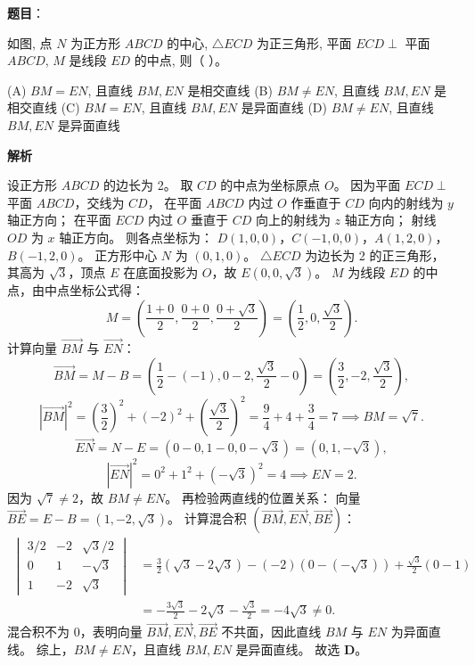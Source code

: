 \begin{answer}

\textbf{题目}：

如图, 点 $N$ 为正方形 $ABCD$ 的中心, $\triangle ECD$ 为正三角形, 平面 $ECD \perp$ 平面 $ABCD$, $M$ 是线段 $ED$ 的中点, 则（ ）。
\nopagebreak[4]
\begin{center}\end{center}
\nopagebreak[4]
(A) $BM = EN$, 且直线 $BM, EN$ 是相交直线  
(B) $BM \neq EN$, 且直线 $BM, EN$ 是相交直线  
(C) $BM = EN$, 且直线 $BM, EN$ 是异面直线  
(D) $BM \neq EN$, 且直线 $BM, EN$ 是异面直线

\textbf{解析}

设正方形 $ABCD$ 的边长为 2。
取 $CD$ 的中点为坐标原点 $O$。
因为平面 $ECD \perp$ 平面 $ABCD$，交线为 $CD$，
在平面 $ABCD$ 内过 $O$ 作垂直于 $CD$ 向内的射线为 $y$ 轴正方向；
在平面 $ECD$ 内过 $O$ 垂直于 $CD$ 向上的射线为 $z$ 轴正方向；
射线 $OD$ 为 $x$ 轴正方向。
则各点坐标为：
$D(1, 0, 0)$，$C(-1, 0, 0)$，$A(1, 2, 0)$，$B(-1, 2, 0)$。
正方形中心 $N$ 为 $(0, 1, 0)$。
$\triangle ECD$ 为边长为 2 的正三角形，其高为 $\sqrt{3}$，顶点 $E$ 在底面投影为 $O$，故 $E(0, 0, \sqrt{3})$。
$M$ 为线段 $ED$ 的中点，由中点坐标公式得：
\nopagebreak[4]
\[M = \left(\frac{1+0}{2}, \frac{0+0}{2}, \frac{0+\sqrt{3}}{2}\right) = \left(\frac{1}{2}, 0, \frac{\sqrt{3}}{2}\right).\]
计算向量 $\vec{BM}$ 与 $\vec{EN}$：
\nopagebreak[4]
\[\vec{BM} = M - B = \left(\frac{1}{2} - (-1), 0 - 2, \frac{\sqrt{3}}{2} - 0\right) = \left(\frac{3}{2}, -2, \frac{\sqrt{3}}{2}\right),\]
\nopagebreak[4]
\[|\vec{BM}|^2 = \left(\frac{3}{2}\right)^2 + (-2)^2 + \left(\frac{\sqrt{3}}{2}\right)^2 = \frac{9}{4} + 4 + \frac{3}{4} = 7 \implies BM = \sqrt{7}.\]
\nopagebreak[4]
\[\vec{EN} = N - E = (0 - 0, 1 - 0, 0 - \sqrt{3}) = (0, 1, -\sqrt{3}),\]
\nopagebreak[4]
\[|\vec{EN}|^2 = 0^2 + 1^2 + (-\sqrt{3})^2 = 4 \implies EN = 2.\]
因为 $\sqrt{7} \neq 2$，故 $BM \neq EN$。
再检验两直线的位置关系：
向量 $\vec{BE} = E - B = (1, -2, \sqrt{3})$。
计算混合积 $(\vec{BM}, \vec{EN}, \vec{BE})$：
\nopagebreak[4]
\[
\begin{aligned}
\begin{vmatrix} 3/2 & -2 & \sqrt{3}/2 \\ 0 & 1 & -\sqrt{3} \\ 1 & -2 & \sqrt{3} \end{vmatrix}
&= \frac{3}{2}(\sqrt{3} - 2\sqrt{3}) - (-2)(0 - (-\sqrt{3})) + \frac{\sqrt{3}}{2}(0 - 1) \\
&= -\frac{3\sqrt{3}}{2} - 2\sqrt{3} - \frac{\sqrt{3}}{2} = -4\sqrt{3} \neq 0.
\end{aligned}
\]
混合积不为 0，表明向量 $\vec{BM}, \vec{EN}, \vec{BE}$ 不共面，因此直线 $BM$ 与 $EN$ 为异面直线。
综上，$BM \neq EN$，且直线 $BM, EN$ 是异面直线。
故选 \textbf{D}。


\end{answer}
